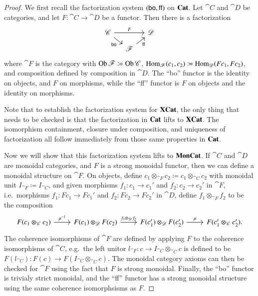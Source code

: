 \documentclass[12pt,oneside,article,draft]{memoir}
\begin{document}
\begin{proof}

We first recall the factorization system $(\mathsf{bo},\mathsf{ff})$ on $\mathbf{Cat}$. Let $\cat{C}$ and $\cat{D}$ be categories, and let $F\colon\cat{C}\to\cat{D}$ be a functor. Then there is a factorization
\[
\begin{tikzcd}[column sep=small, row sep=small]
  \cat{C} \ar[rr, "F"] \ar[dr, "\bo"'] && \cat{D} \\
  & \cat{F} \ar[ur, "\ff"']
\end{tikzcd}
\]
where $\cat{F}$ is the category with $\operatorname{Ob}\mathscr{F}\coloneqq \operatorname{Ob}\mathscr{C}$, $\operatorname{Hom}_{\mathscr{F}}(c_1,c_2)\coloneqq\operatorname{Hom}_{\mathscr{D}}(Fc_1,Fc_2)$, and composition defined by composition in $\cat{D}$. The ``bo'' functor is the identity on objects, and $F$ on morphisms, while the ``ff'' functor is $F$ on objects and the identity on morphisms.

Note that to establish the factorization system for $\mathbf{XCat}$, the only thing that needs to be checked is that the factorization in $\mathbf{Cat}$ lifts to $\mathbf{XCat}$. The isomorphism containment, closure under composition, and uniqueness of factorization all follow immediately from those same properties in $\mathbf{Cat}$.

Now we will show that this factorization system lifts to $\mathbf{MonCat}$. If $\cat{C}$ and $\cat{D}$ are monoidal categories, and $F$ is a strong monoidal functor, then we can define a monoidal structure on $\cat{F}$. On objects, define $c_1\otimes_{\cat{F}}c_2\coloneqq c_1\otimes_{\cat{C}}c_2$ with monoidal unit $I_{\cat{F}}\coloneqq I_{\cat{C}}$, and given morphisms $f_1\colon c_1\to c_1'$ and $f_2\colon c_2\to c_2'$ in $\cat{F}$, i.e.~morphisms $f_1\colon Fc_1\to Fc_1'$ and $f_2\colon Fc_2\to Fc_2'$ in $\cat{D}$, define $f_1\otimes_{\cat{F}}f_2$ to be the composition
\[
\begin{tikzcd}
  F(c_1\otimes_{\cat{C}}c_2) \ar[r,"\mu^{-1}"] & F(c_1)\otimes_{\cat{D}}F(c_2) \ar[r,"f_1\otimes_{\cat{D}}f_2"] & F(c_1')\otimes_{\cat{D}}F(c_2') \ar[r,"\mu"] & F(c_1'\otimes_{\cat{C}}c_2').
\end{tikzcd}
\]
The coherence isomorphisms of $\cat{F}$ are defined by applying $F$ to the coherence isomorphisms of $\cat{C}$, e.g.~the left unitor $l_{\cat{F}}\colon c\to I_{\cat{C}}\otimes_{\cat{C}}c$ is defined to be $F(l_{\cat{C}})\colon F(c)\to F(I_{\cat{C}}\otimes_{\cat{C}}c)$. The monoidal category axioms can then be checked for $\cat{F}$ using the fact that $F$ is strong monoidal. Finally, the ``bo'' functor is trivialy strict monoidal, and the ``ff'' functor has a strong monoidal structure using the same coherence isomorphsisms as $F$.


\end{proof}
\end{document}
